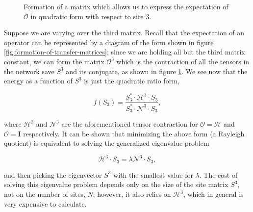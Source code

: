 \documentclass{amsbook}
\theoremstyle{plain}
\theoremstyle{definition}
\theoremstyle{remark}
\begin{document}
\begin{figure}
\caption{Formation of a matrix which allows us to express the expectation of $\mathscr{O}$ in quadratic form with respect to site 3.}
\label{fig:Omatrix}
\end{figure}

Suppose we are varying over the third matrix.  Recall that the expectation of an operator can be represented by a diagram of the form shown in figure \ref{fig:formation-of-transfer-matrices};  since we are holding all but the third matrix constant, we can form the matrix $\mathscr{O}^{3}$ which is the contraction of all the tensors in the network save $S^3$ and its conjugate, as shown in figure \ref{fig:Omatrix}.  We see now that the energy as a function of $S^3$ is just the quadratic ratio form,

$$f(S_3) = \frac{S^*_3\cdot \mathscr{H}^3 \cdot S_3}{S^*_3 \cdot \mathscr{N}^3 \cdot S_3},$$

\noindent where $\mathscr{H}^3$ and $\mathscr{N}^3$ are the aforementioned tensor contraction for $\mathscr{O}=\mathscr{H}$ and $\mathscr{O}=\textbf{I}$ respectively.  It can be shown that minimizing the above form (a Rayleigh quotient) is equivalent to solving the generalized eigenvalue problem

$$\mathscr{H}^3 \cdot S_3 = \lambda \mathscr{N}^3\cdot S_3,$$

\noindent and then picking the eigenvector $S^3$ with the smallest value for $\lambda$.  The cost of solving this eigenvalue problem depends only on the size of the site matrix $S^3$, not on the number of sites, $N$;  however, it also relies on $\mathscr{H}^3$, which in general is very expensive to calculate.
\end{document}
